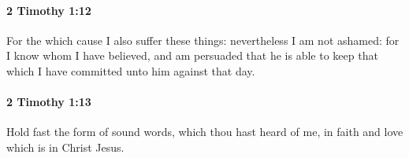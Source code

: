 		\paragraph{2 Timothy 1:12} %
			\label{2TIMOTHY-1-12}

			For the which cause I also suffer these things: nevertheless I am not ashamed: for I know whom I have believed, and am persuaded that he is able to keep that which I have committed unto him against that day.

			\begin{framed}
			\scriptsize
				\begin{compactdesc}
					\item[SBLG] 
				\end{compactdesc}
			\end{framed}

		\paragraph{2 Timothy 1:13} %
			\label{2TIMOTHY-1-13}

			Hold fast the form of sound words, which thou hast heard of me, in faith and love which is in Christ Jesus.

